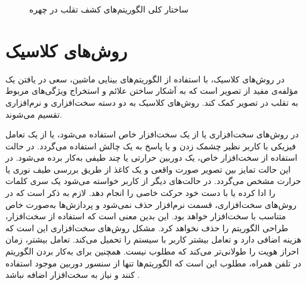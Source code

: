 \begin{figure}[ht]
	\centering
{}
\caption{ساختار کلی الگوریتم‌های کشف تقلب در چهره}
\label{fig:algs}
\end{figure}
\section{روش‌های کلاسیک}
در روش‌های کلاسیک، با استفاده از الگوریتم‌های بینایی ماشین، سعی در یافتن یک مؤلفه‌ی مفید از تصویر است که به آشکار ساختن  علائم و استخراج ویژگی‌های مربوط به تقلب در تصویر کمک کند. روش‌های کلاسیک به دو دسته سخت‌افزاری و نرم‌افزاری تقسیم می‌شوند.
\cite{ramachandra2017presentation}


در روش‌های سخت‌افزاری یا از یک سخت‌افزار خاص استفاده می‌شود، یا از یک تعامل فیزیکی با کاربر نظیر چشمک زدن و یا پاسخ به یک چالش استفاده می‌گردد.
در حالت استفاده از سخت‌افزار خاص، یک دوربین حرارتی یا چند طیفی به‌کار برده می‌شود. در این حالت تمایز بین تصویر صورت واقعی و یک کاغذ از طریق بررسی طیف نوری یا حرارت مشخص می‌گردد. در حالت‌های دیگر از کاربر خواسته می‌شود یک سری کلمات را ادا کرده یا با دست خود حرکت خاصی را انجام دهد.
لازم به ذکر است که در روش‌های سخت‌افزاری، قسمت نرم‌افزار حذف نمی‌شود و پردازش‌ها به‌صورت خاص متناسب با سخت‌افزار خواهد بود. این بدین معنی است که استفاده از سخت‌افزار، طراحی الگوریتم را حذف نخواهد کرد.
مشکل روش‌های سخت‌افزاری این است که هزینه اضافی دارد و تعامل بیشتر کاربر با سیستم را تحمیل می‌کند. تعامل بیشتر، زمان احراز هویت را طولانی‌تر می‌کند که مطلوب نیست. همچنین برای به‌کار بردن الگوریتم در تلفن همراه، مطلوب این است که الگوریتم‌ها تنها از سنسور دوربین موجود استفاده کنند و نیاز به سخت‌افزار اضافه نباشد
\cite{ramachandra2017presentation}.

